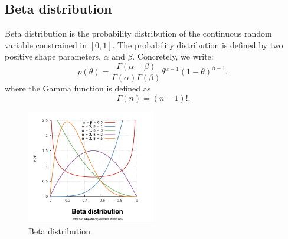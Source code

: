 \documentclass[11pt]{article}
\begin{document}
\subsection{Beta distribution}
Beta distribution is the probability distribution of the continuous random variable constrained in $[0,1]$. The probability distribution is defined by two positive shape parameters, $\alpha$ and $\beta$. Concretely, we write:
\[p(\theta) = \frac{\Gamma(\alpha + \beta)}{\Gamma(\alpha)\Gamma(\beta)} \theta^{\alpha-1}(1-\theta)^{\beta-1}, \]
where the Gamma function is defined as 
\[\Gamma(n) = (n-1)!.\]
\begin{figure}[H]
    \centering
    \includegraphics[width=0.5\textwidth]{lecture_13_B/figure/beta.png}
    \caption{Beta distribution}
    \label{fig:beta}
\end{figure}
\end{document}
